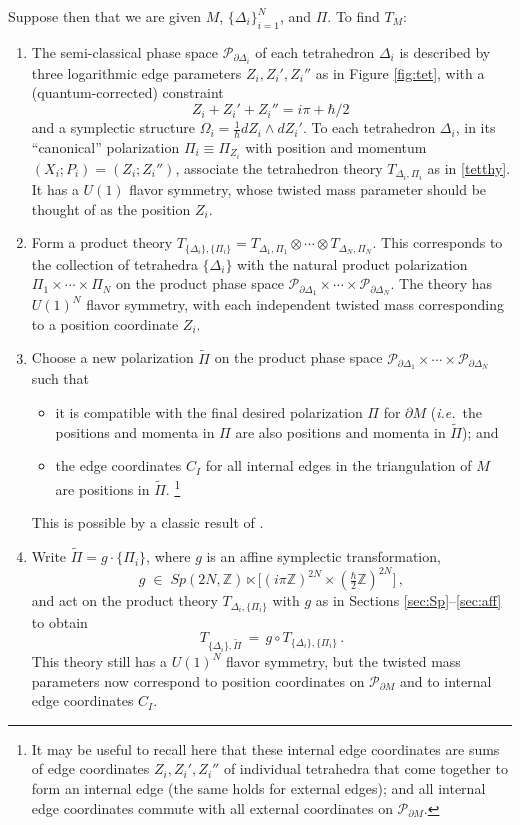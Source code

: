 \documentclass[11pt,letterpaper]{article}
\numberwithin{equation}{section}
\newcommand{\be}{\begin{equation}}
\newcommand{\ee}{\end{equation}}
\newcommand{\wt}{\widetilde}
\newcommand{\ie}{\emph{i.e.}}
\newcommand{\Z}{{\mathbb Z}}
\newcommand{\pd}{\partial}
\newcommand{\CP}{\mathcal{P}}
\begin{document}
Suppose then that we are given $M$, $\{\Delta_i\}_{i=1}^N$, and $\Pi$. To find $T_M$:
%
\begin{enumerate}

\item The semi-classical phase space $\CP_{\pd\Delta_i}$ of each tetrahedron $\Delta_i$ is described by three logarithmic edge parameters $Z_i,Z_i',Z_i''$ as in Figure \ref{fig:tet}, with a (quantum-corrected) constraint
%
\be Z_i + Z_i'+Z_i'' = i\pi + \hbar/2\, \label{Phbar} \ee
%
and a symplectic structure $\Omega_i = \frac{1}{\hbar} dZ_i\wedge dZ_i'$.
To each tetrahedron $\Delta_i$, in its ``canonical'' polarization $\Pi_i\equiv \Pi_{Z_i}$ with position and momentum $(X_i;P_i)=(Z_i;Z_i'')$, associate the tetrahedron theory $T_{\Delta_i,\Pi_i}$ as in \eqref{tetthy}. It has a $U(1)$ flavor symmetry, whose twisted mass parameter should be thought of as the position $Z_i$.

\item Form a product theory $T_{\{\Delta_i\},\{\Pi_i\}}=T_{\Delta_1,\Pi_1}\otimes\cdots\otimes T_{\Delta_N,\Pi_N}$. This corresponds to the collection of tetrahedra $\{\Delta_i\}$ with the natural product polarization $\Pi_1\times\cdots \times \Pi_N$ on the product phase space $\CP_{\pd \Delta_1}\times\cdots\times \CP_{\pd \Delta_N}$. The theory has $U(1)^N$ flavor symmetry, with each independent twisted mass corresponding to a position coordinate $Z_i$.

\item \label{step3} Choose a new polarization $\wt\Pi$ on the product phase space $\CP_{\pd \Delta_1}\times\cdots\times \CP_{\pd \Delta_N}$ such that
%
\begin{itemize}
\item it is compatible with the final desired polarization $\Pi$ for $\pd M$ (\ie\ the positions and momenta in $\Pi$ are also positions and momenta in $\wt\Pi$); and
\item the edge coordinates $C_I$ for all internal edges in the triangulation of $M$ are positions in $\wt\Pi$.%
%
\footnote{It may be useful to recall here that these internal edge coordinates are sums of edge coordinates $Z_i,Z_i',Z_i''$ of individual tetrahedra that come together to form an internal edge (the same holds for external edges); and all internal edge coordinates commute with all external coordinates on $\CP_{\pd M}$.}
\end{itemize}
%
This is possible by a classic result of \cite{NZ}.

\item Write $\wt \Pi = g\cdot \{\Pi_i\}$, where $g$ is an affine symplectic transformation,
%
\be g\;\in\; Sp(2N,\Z)\ltimes \big[(i\pi\Z)^{2N}\times (\tfrac\hbar2\Z)^{2N}\big]\,, \label{ggen} \ee
%
and act on the product theory $T_{{\Delta_i},\{\Pi_i\}}$ with $g$ as in Sections \ref{sec:Sp}--\ref{sec:aff} to obtain
%
\be T_{\{\Delta_i\},\tilde\Pi}\,=\,g\circ T_{\{\Delta_i\},\{\Pi_i\}}\,.\ee
%
This theory still has a $U(1)^N$ flavor symmetry, but the twisted mass parameters now correspond to position coordinates on $\CP_{\pd M}$ and to internal edge coordinates $C_I$.


\end{enumerate}
\end{document}
